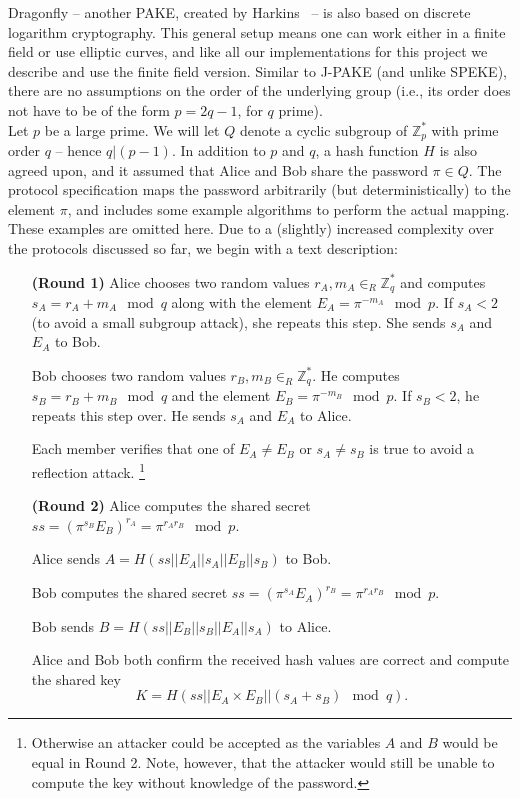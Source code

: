 
Dragonfly -- another PAKE, created by Harkins~\cite{Ha15} -- is also based on discrete logarithm cryptography.  This general setup means one can work  either in a finite field or use elliptic curves, and like all our implementations for this project we describe and use the finite field version. 
Similar to J-PAKE (and unlike SPEKE), there are no assumptions on the order of the underlying group (i.e., its order does not have to be of the
form $p = 2q-1$, for $q$ prime).
\\

Let $p$ be a large prime. We will let $Q$ denote a cyclic subgroup of $\mathbb{Z}_p^*$ with prime order $q$ -- hence $q | (p-1)$. In addition to $p$ and $q$, a hash function $H$ is also agreed upon, and it assumed that Alice and Bob share the password $\pi \in Q$. The protocol specification maps the password
arbitrarily (but deterministically) to the element $\pi$, and includes some example algorithms to perform the actual mapping. These examples are omitted here. Due to a (slightly) increased complexity over the protocols discussed so far, we begin with a text description:

\begin{itemize}
    \item[\textbf{(Round 1)}] Alice chooses two random values $r_A, m_A \in_R \mathbb{Z}_q^*$ and computes $s_A = r_A + m_A \mod q$ along with the element
        $E_A = \pi^{-m_A} \mod p$. If $s_A < 2$ (to avoid a small subgroup attack), she repeats this step. She sends $s_A$ and $E_A$ to Bob.
        \label{enum:dragonfly2}
    \item[]
    \item[] Bob chooses two random values $r_B, m_B \in_R \mathbb{Z}_q^*$. He computes $s_B = r_B + m_B \mod q$ and the element
        $E_B = \pi^{-m_B} \mod p$. If $s_B < 2$, he repeats this step over. He sends $s_A$ and $E_A$ to Alice.
        \label{enum:dragonfly3}
    \item[]
    \item[] Each member verifies that one of $E_A \neq E_B$ or $s_A \neq s_B$ is true to avoid a reflection attack.
        \footnote{Otherwise an attacker could be accepted as the variables $A$ and $B$ would be equal in Round 2. Note, however, that the attacker would still be unable to compute the key without knowledge of the password.}
    \item[]
    \item[\textbf{(Round 2)}] Alice computes the shared secret $ss = (\pi^{s_B} E_B)^{r_A} = \pi^{r_A r_B} \mod p$. 
    \item[] Alice sends $A = H(ss || E_A || s_A || E_B || s_B)$ to Bob.
    \item[]
    \item[] Bob computes the shared secret $ss = (\pi^{s_A} E_A)^{r_B} = \pi^{r_A r_B} \mod p$. 
    \item[] Bob sends $B = H(ss || E_B || s_B || E_A || s_A)$ to Alice.
    \item[]
    \item[] Alice and Bob both confirm the received hash values are correct and compute the shared key 
    \[ K = H(ss || E_A \times E_B || (s_A + s_B) \mod q).\]
\end{itemize}

